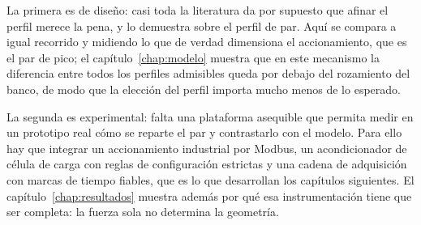 La primera es de diseño: casi toda la literatura da por supuesto que afinar el perfil merece la
pena, y lo demuestra sobre el perfil de par. Aquí se compara a igual recorrido y midiendo lo que de
verdad dimensiona el accionamiento, que es el par de pico; el capítulo~\ref{chap:modelo} muestra que
en este mecanismo la diferencia entre todos los perfiles admisibles queda por debajo del rozamiento
del banco, de modo que la elección del perfil importa mucho menos de lo esperado.

La segunda es experimental: falta una plataforma asequible que permita medir en un prototipo real
cómo se reparte el par y contrastarlo con el modelo. Para ello hay que integrar un accionamiento
industrial por Modbus, un acondicionador de célula de carga con reglas de configuración estrictas y
una cadena de adquisición con marcas de tiempo fiables, que es lo que desarrollan los capítulos
siguientes. El capítulo~\ref{chap:resultados} muestra además por qué esa instrumentación tiene que
ser completa: la fuerza sola no determina la geometría.
